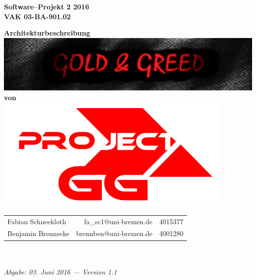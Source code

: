 \documentclass[fontsize=12pt,paper=a4,twoside]{scrartcl}
\begin{document}
  \thispagestyle{fancy}
  \fancyhead[LO,RE]{ }
  \fancyfoot[C]{}

  \vspace{3cm}

  \begin{minipage}[H]{\textwidth}
  \begin{center}
  \bfseries
  \Large
  Software--Projekt 2 2016\\
  \smallskip
  \small
  VAK 03-BA-901.02\\
  \vspace{3cm}
  \end{center}
  \end{minipage}
  \begin{minipage}[H]{\textwidth}
  \begin{center}
  \vspace{1cm}
  \bfseries
  \Large Architekturbeschreibung\\
  \includegraphics[scale=0.5]{banner.jpg}\\
  \Large von\\
  \includegraphics[scale=0.5]{ProjectGG.png}
  \vfill
  \end{center}
  \end{minipage}
  \vfill
  \begin{minipage}[H]{\textwidth}
  \begin{center}
  \sffamily
  \begin{tabular}{lrr}
  Fabian Schneekloth & fa\_sc1@uni-bremen.de & 4015377\\
  Benjamin Brennecke & brennben@uni-bremen.de & 4001280\\
  \end{tabular}
  \\ ~
  \vspace{2cm}
  \\
  \itshape Abgabe: 03. Juni 2016 --- Version 1.1\\ ~
  \end{center}
  \end{minipage}
\end{document}
